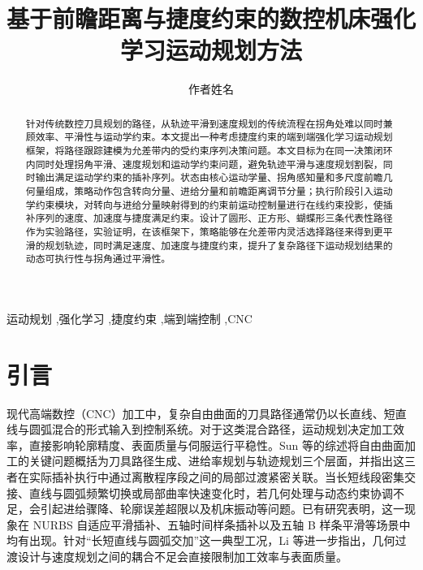 \documentclass[preprint,12pt]{elsarticle}
\begin{document}
\begin{frontmatter}

\title{基于前瞻距离与捷度约束的数控机床强化学习运动规划方法}

\author[1]{作者姓名}

\begin{abstract}
针对传统数控刀具规划的路径，从轨迹平滑到速度规划的传统流程在拐角处难以同时兼顾效率、平滑性与运动学约束。本文提出一种考虑捷度约束的端到端强化学习运动规划框架，将路径跟踪建模为允差带内的受约束序列决策问题。本文目标为在同一决策闭环内同时处理拐角平滑、速度规划和运动学约束问题，避免轨迹平滑与速度规划割裂，同时输出满足运动学约束的插补序列。状态由核心运动学量、拐角感知量和多尺度前瞻几何量组成，策略动作包含转向分量、进给分量和前瞻距离调节分量；执行阶段引入运动学约束模块，对转向与进给分量映射得到的约束前运动控制量进行在线约束投影，使插补序列的速度、加速度与捷度满足约束。设计了圆形、正方形、蝴蝶形三条代表性路径作为实验路径，实验证明，在该框架下，策略能够在允差带内灵活选择路径来得到更平滑的规划轨迹，同时满足速度、加速度与捷度约束，提升了复杂路径下运动规划结果的动态可执行性与拐角通过平滑性。
\end{abstract}

\begin{keyword}
运动规划 \sep 强化学习 \sep 捷度约束 \sep 端到端控制 \sep CNC
\end{keyword}

\end{frontmatter}

\section{引言}
\label{sec:intro}

现代高端数控（CNC）加工中，复杂自由曲面的刀具路径通常仍以长直线、短直线与圆弧混合的形式输入到控制系统。对于这类混合路径，运动规划决定加工效率，直接影响轮廓精度、表面质量与伺服运行平稳性。Sun 等\cite{Sun2022}的综述将自由曲面加工的关键问题概括为刀具路径生成、进给率规划与轨迹规划三个层面，并指出这三者在实际插补执行中通过离散程序段之间的局部过渡紧密关联。当长短线段密集交接、直线与圆弧频繁切换或局部曲率快速变化时，若几何处理与动态约束协调不足，会引起进给骤降、轮廓误差超限以及机床振动等问题。已有研究表明，这一现象在 NURBS 自适应平滑插补\cite{Xu2022}、五轴时间样条插补\cite{Wu2023}以及五轴 B 样条平滑\cite{Hu2024}等场景中均有出现。针对“长短直线与圆弧交加”这一典型工况，Li 等\cite{Li2023}进一步指出，几何过渡设计与速度规划之间的耦合不足会直接限制加工效率与表面质量。
\end{document}
